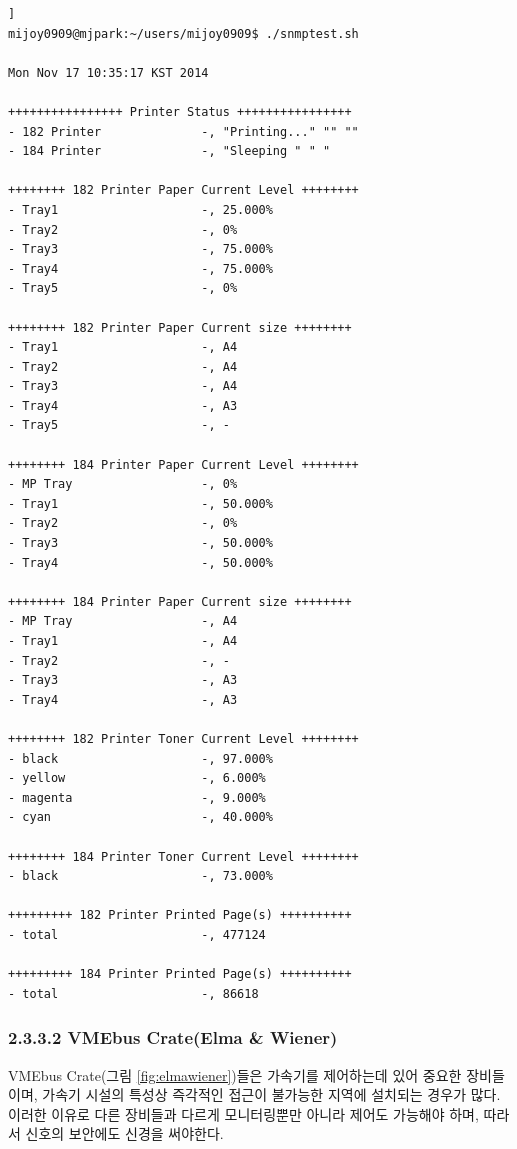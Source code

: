 \documentclass[11pt
  , a4paper
  , article
  , oneside
]{memoir}
\begin{document}
\begin{lstlisting}[style=termstyle, caption=Xerox \& Kyocera사 Printer 모니터링 결과]]
mijoy0909@mjpark:~/users/mijoy0909$ ./snmptest.sh 
 
Mon Nov 17 10:35:17 KST 2014
 
++++++++++++++++ Printer Status ++++++++++++++++
- 182 Printer              -, "Printing..." "" ""
- 184 Printer              -, "Sleeping " " "
 
++++++++ 182 Printer Paper Current Level ++++++++
- Tray1                    -, 25.000%
- Tray2                    -, 0%
- Tray3                    -, 75.000%
- Tray4                    -, 75.000%
- Tray5                    -, 0%
 
++++++++ 182 Printer Paper Current size ++++++++
- Tray1                    -, A4
- Tray2                    -, A4
- Tray3                    -, A4
- Tray4                    -, A3
- Tray5                    -, -
 
++++++++ 184 Printer Paper Current Level ++++++++
- MP Tray                  -, 0%
- Tray1                    -, 50.000%
- Tray2                    -, 0%
- Tray3                    -, 50.000%
- Tray4                    -, 50.000%
 
++++++++ 184 Printer Paper Current size ++++++++
- MP Tray                  -, A4
- Tray1                    -, A4
- Tray2                    -, -
- Tray3                    -, A3
- Tray4                    -, A3
 
++++++++ 182 Printer Toner Current Level ++++++++
- black                    -, 97.000%
- yellow                   -, 6.000%
- magenta                  -, 9.000%
- cyan                     -, 40.000%
 
++++++++ 184 Printer Toner Current Level ++++++++
- black                    -, 73.000%
 
+++++++++ 182 Printer Printed Page(s) ++++++++++
- total                    -, 477124
 
+++++++++ 184 Printer Printed Page(s) ++++++++++
- total                    -, 86618
\end{lstlisting}


\subsubsection{2.3.3.2 VMEbus Crate(Elma \& Wiener)}
VMEbus Crate(그림 \ref{fig:elmawiener})들은 가속기를 제어하는데 있어 중요한 장비들이며, 가속기 시설의 특성상 즉각적인 접근이 불가능한 지역에 설치되는 경우가 많다. 이러한 이유로 다른 장비들과 다르게 모니터링뿐만 아니라 제어도 가능해야 하며, 따라서 신호의 보안에도 신경을 써야한다. 
\end{document}
